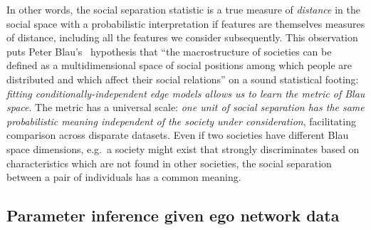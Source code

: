 \documentclass{scrartcl}
\begin{document}
\begin{refsection}
In other words, the social separation statistic is a true measure of \emph{distance} in the social space with a probabilistic interpretation if features are themselves measures of distance, including all the features we consider subsequently. This observation puts Peter Blau's~\cite{Blau1977} hypothesis that ``the macrostructure of societies can be defined as a multidimensional space of social positions among which people are distributed and which affect their social relations'' on a sound statistical footing: \emph{fitting conditionally-independent edge models allows us to learn the metric of Blau space}. The metric has a universal scale: \emph{one unit of social separation has the same probabilistic meaning independent of the society under consideration}, facilitating comparison across disparate datasets. Even if two societies have different Blau space dimensions, e.g.\ a society might exist that strongly discriminates based on characteristics which are not found in other societies, the social separation between a pair of individuals has a common meaning. %

\subsection{Parameter inference given ego network data\label{sec:inference}}


\end{refsection}
\end{document}
